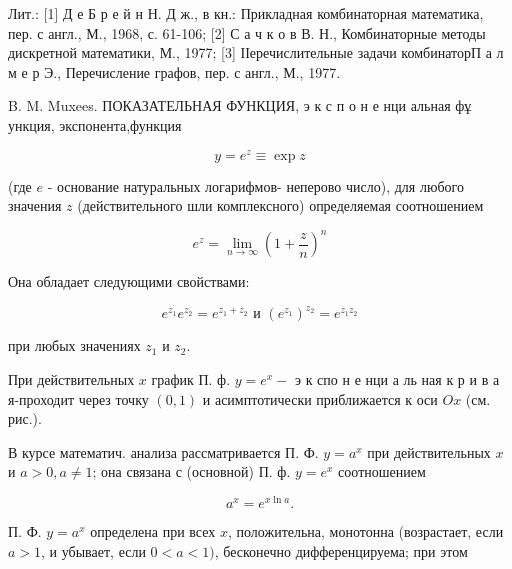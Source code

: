 \documentclass[10pt]{article}
\begin{document}
Лит.: [1] Д е Б р е й н Н. Д ж., в кн.: Прикладная комбинаторная математика, пер. с англ., М., 1968, с. 61-106; [2] С а ч к о в В. Н., Комбинаторные методы дискретной математики, М., 1977; [3] ІІеречислительные задачи комбинаторП а л м е р Э., Перечисление графов, пер. с англ., М., 1977.



B. M. Muxees. ПОКАЗАТЕЛЬНАЯ ФУНКЦИЯ, э к с п о н е нци альная фұ ункция, экспонента,функция



\[

y=e^{z} \equiv \exp z

\]



(где $e$ - основание натуральных логарифмов- неперово число), для любого значения $z$ (действительного шли комплексного) определяемая соотношением



\[

e^{z}=\lim _{n \rightarrow \infty}\left(1+\frac{z}{n}\right)^{n}

\]



Она обладает следующими свойствами:



\[

e^{z_{1}} e^{z_{2}}=e^{z_{1}+z_{2}} \text { и }\left(e^{z_{1}}\right)^{z_{2}}=e^{z_{1} z_{2}}

\]



при любых значениях $z_{1}$ и $z_{2}$.



При действительных $x$ график П. ф. $y=e^{x}-$ э к спо н е нци а ль ная к р и в а я-проходит через точку $(0,1)$ и асимптотически приближается к оси $O x$ (см. рис.).



В курсе математич. анализа рассматривается П. Ф. $y=a^{x}$ при действительных $x$ и $a>0, a \neq 1$; она связана с (основной) П. ф. $y=e^{x}$ соотношением



\[

a^{x}=e^{x \ln a} .

\]



П. Ф. $y=a^{x}$ определена при всех $x$, положительна, монотонна (возрастает, если $a>1$, и убывает, если $0<a<1)$, бесконечно дифференцируема; при этом
\end{document}
